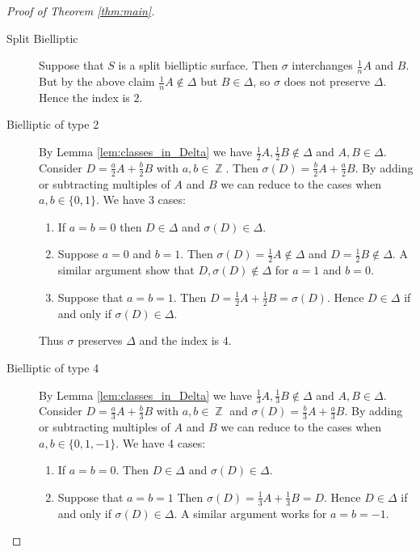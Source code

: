 \documentclass[a4paper, 12pt, twoside]{amsart}
\theoremstyle{plain}
\theoremstyle{definition}
\DeclareMathOperator{\Z}{\mathbb{Z}}
\begin{document}
\begin{proof}[Proof of Theorem \ref{thm:main}]
\begin{description}
\item[Split Bielliptic] Suppose that $S$ is a split bielliptic
  surface. Then $\sigma$ interchanges $\frac{1}{n}A$ and $B$. But by
  the above claim $\frac{1}{n}A \notin \Delta$ but $B \in \Delta$, so
  $\sigma$ does not preserve $\Delta$. Hence the index is $2$.
\item[Bielliptic of type 2] By Lemma \ref{lem:classes_in_Delta} we have
  $\frac{1}{2}A, \frac{1}{2}B \notin \Delta$ and $A,B \in \Delta$.
  Consider $D = \frac{a}{2}A + \frac{b}{2}B$ with $a,b \in \Z$. Then
  $\sigma(D) = \frac{b}{2}A + \frac{a}{2}B$. By adding or subtracting
  multiples of $A$ and $B$ we can reduce to the cases when
  $a,b \in \{0,1\}$. We have 3 cases:

  \begin{enumerate}
  \item If $a = b = 0$ then $D \in \Delta$ and $\sigma(D) \in \Delta$.

  \item Suppose $a = 0$ and $b = 1$. Then
    $\sigma(D) = \frac{1}{2}A \not\in \Delta$ and
    $D = \frac{1}{2}B \not\in \Delta$. A similar argument show that
    $D,\sigma(D) \not\in \Delta$ for $a = 1$ and $b = 0$.

  \item Suppose that $a = b = 1$. Then
    $D = \frac{1}{2}A + \frac{1}{2}B = \sigma(D)$. Hence
    $D \in \Delta$ if and only if $\sigma(D) \in \Delta$.
  \end{enumerate}

  Thus $\sigma$ preserves $\Delta$ and the index is $4$.
\item[Bielliptic of type 4] By Lemma \ref{lem:classes_in_Delta} 
  we have $\frac{1}{3}A, \frac{1}{3}B \notin \Delta$ and
  $A,B \in \Delta$.  Consider $D = \frac{a}{3}A + \frac{b}{3}B$ with
  $a,b \in \Z$ and $\sigma(D) = \frac{b}{3}A + \frac{a}{3}B$. By
  adding or subtracting multiples of $A$ and $B$ we can reduce to the
  cases when $a,b \in \{0,1,-1\}$. We have 4 cases:

  \begin{enumerate}
  \item If $a = b =0$. Then $D \in \Delta$ and $\sigma(D) \in \Delta$.

  \item Suppose that $a = b = 1$ Then
    $\sigma(D) = \frac{1}{3}A + \frac{1}{3}B = D$. Hence
    $D \in \Delta$ if and only if $\sigma(D) \in \Delta$. A similar
    argument works for $a = b = -1$.


\end{enumerate}
\end{description}
\end{proof}
\end{document}
